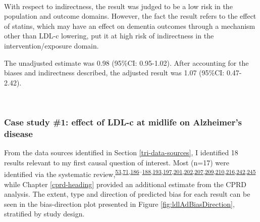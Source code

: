 \documentclass[a4paper, twoside]{templates/ociamthesis}
\begin{document}
~

With respect to indirectness, the result was judged to be a low risk in the population and outcome domains. However, the fact the result refers to the effect of statins, which may have an effect on dementia outcomes through a mechanism other than LDL-c lowering, put it at high risk of indirectness in the intervention/exposure domain.

The unadjusted estimate was 0.98 (95\%CI: 0.95-1.02). After accounting for the biases and indirectness described, the adjusted result was 1.07 (95\%CI: 0.47-2.42).

~

\hypertarget{case-study-1-effect-of-ldl-c-at-midlife-on-alzheimers-disease}{%
\subsubsection{Case study \#1: effect of LDL-c at midlife on Alzheimer's disease}\label{case-study-1-effect-of-ldl-c-at-midlife-on-alzheimers-disease}}

From the data sources identified in Section \ref{tri-data-sources}, I identified 18 results relevant to my first causal question of interest. Most (n=17) were identified via the systematic review,\textsuperscript{\protect\hyperlink{ref-schilling2017}{53},\protect\hyperlink{ref-ostergaard2015}{71},\protect\hyperlink{ref-ancelin2012}{186}--\protect\hyperlink{ref-bettermann2012}{188},\protect\hyperlink{ref-chou2014}{193},\protect\hyperlink{ref-haag2009}{197},\protect\hyperlink{ref-li2004}{201},\protect\hyperlink{ref-li2010}{202},\protect\hyperlink{ref-rea2005}{207},\protect\hyperlink{ref-reitz2010}{209},\protect\hyperlink{ref-smeeth2009}{210},\protect\hyperlink{ref-zandi2005}{216},\protect\hyperlink{ref-tynkkynen2018}{242},\protect\hyperlink{ref-yoshitake1995}{245}} while Chapter \ref{cprd-heading} provided an additional estimate from the CPRD analysis. The extent, type and direction of predicted bias for each result can be seen in the bias-direction plot presented in Figure \ref{fig:ldlAdBiasDirection}, stratified by study design.

~
\end{document}

